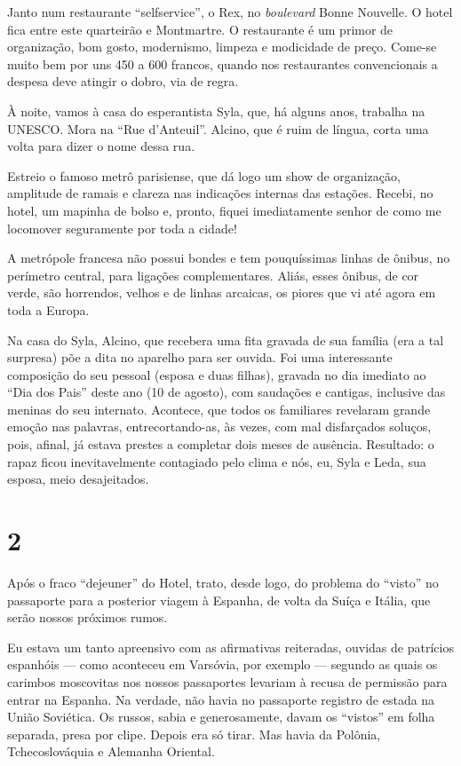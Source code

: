 Janto num restaurante ``selfservice'', o Rex, no \textit{boulevard} Bonne Nouvelle. O hotel fica entre este quarteirão e Montmartre. O restaurante é um primor de organização, bom gosto, modernismo, limpeza e modicidade de preço. Come-se muito bem por uns 450 a 600 francos, quando nos restaurantes convencionais a despesa deve atingir o dobro, via de regra.

À noite, vamos à casa do esperantista Syla, que, há alguns anos, trabalha na UNESCO. Mora na ``Rue d’Anteuil''. Alcino, que é ruim de língua, corta uma volta para dizer o nome dessa rua.

Estreio o famoso metrô parisiense, que dá logo um show de organização, amplitude de ramais e clareza nas indicações internas das estações. Recebi, no hotel, um mapinha de bolso e, pronto, fiquei imediatamente senhor de como me locomover seguramente por toda a cidade!

A metrópole francesa não possui bondes e tem pouquíssimas linhas de ônibus, no perímetro central, para ligações complementares. Aliás, esses ônibus, de cor verde, são horrendos, velhos e de linhas arcaicas, os piores que vi até agora em toda a Europa.

Na casa do Syla, Alcino, que recebera uma fita gravada de sua família (era a tal surpresa) põe a dita no aparelho para ser ouvida. Foi uma interessante composição do seu pessoal (esposa e duas filhas), gravada no dia imediato ao ``Dia dos Pais'' deste ano (10 de agosto), com saudações e cantigas, inclusive das meninas do seu internato. Acontece, que todos os familiares revelaram grande emoção nas palavras, entrecortando-as, às vezes, com mal disfarçados soluços, pois, afinal, já estava prestes a completar dois meses de ausência. Resultado: o rapaz ficou inevitavelmente contagiado pelo clima e nós, eu, Syla e Leda, sua esposa, meio desajeitados.

\section*{2 \adfflatleafright {}}
Após o fraco ``dejeuner'' do Hotel, trato, desde logo, do problema do ``visto'' no passaporte para a posterior viagem à Espanha, de volta da Suíça e Itália, que serão nossos próximos rumos.

Eu estava um tanto apreensivo com as afirmativas reiteradas, ouvidas de patrícios espanhóis --- como aconteceu em Varsóvia, por exemplo --- segundo as quais os carimbos moscovitas nos nossos passaportes levariam à recusa de permissão para entrar na Espanha. Na verdade, não havia no passaporte registro de estada na União Soviética. Os russos, sabia e generosamente, davam os ``vistos'' em folha separada, presa por clipe. Depois era só tirar. Mas havia da Polônia, Tchecoslováquia e Alemanha Oriental.

